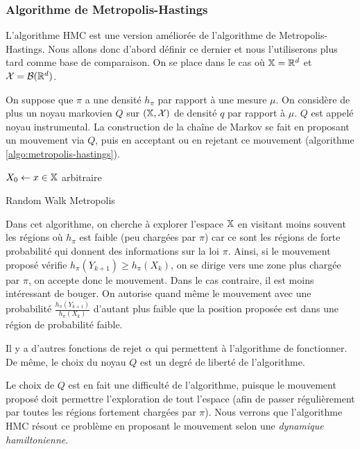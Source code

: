 \documentclass[10pt,a4paper]{article}
\begin{document}
\subsubsection{Algorithme de Metropolis-Hastings}

L'algorithme HMC est une version améliorée de l'algorithme de Metropolis-Hastings. Nous allons donc d'abord définir ce dernier et nous l'utiliserons plus tard comme base de comparaison. On se place dans le cas où $\mathbb{X} = \mathbb{R}^d$ et $\mathcal{X} = \mathcal{B}(\mathbb{R}^d)$. 

On suppose que $\pi$ a une densité $h_\pi$ par rapport à une mesure $\mu$. On considère de plus un noyau markovien $Q$ sur $(\mathbb{X}, \mathcal{X})$ de densité $q$ par rapport à $\mu$. $Q$ est appelé noyau instrumental. La construction de la chaîne de Markov se fait en proposant un mouvement via $Q$, puis en acceptant ou en rejetant ce mouvement (algorithme \ref{algo:metropolis-hastings}).

\begin{center}
\begin{algorithm}[H]
  $X_0 \leftarrow x \in \mathbb{X}$ arbitraire\;
  \caption{Random Walk Metropolis}
  \label{algo:metropolis-hastings}
\end{algorithm}
\end{center}

Dans cet algorithme, on cherche à explorer l'espace $\mathbb{X}$ en visitant moins souvent les régions où $h_\pi$ est faible (peu chargées par $\pi$) car ce sont les régions de forte probabilité qui donnent des informations sur la loi $\pi$. Ainsi, si le mouvement proposé vérifie $h_\pi(Y_{k+1}) \geq h_\pi(X_k)$, on se dirige vers une zone plus chargée par $\pi$, on accepte donc le mouvement. Dans le cas contraire, il est moins intéressant de bouger. On autorise quand même le mouvement avec une probabilité $\frac{h_\pi(Y_{k+1})}{h_\pi(X_k)}$ d'autant plus faible que la position proposée est dans une région de probabilité faible.

\begin{Rque}
  Il y a d'autres fonctions de rejet $\alpha$ qui permettent à l'algorithme de fonctionner. De même, le choix du noyau $Q$ est un degré de liberté de l'algorithme.

  Le choix de $Q$ est en fait une difficulté de l'algorithme, puisque le mouvement proposé doit permettre l'exploration de tout l'espace (afin de passer régulièrement par toutes les régions fortement chargées par $\pi$). Nous verrons que l'algorithme HMC résout ce problème en proposant le mouvement selon une \emph{dynamique hamiltonienne}.
\end{Rque}
\end{document}
